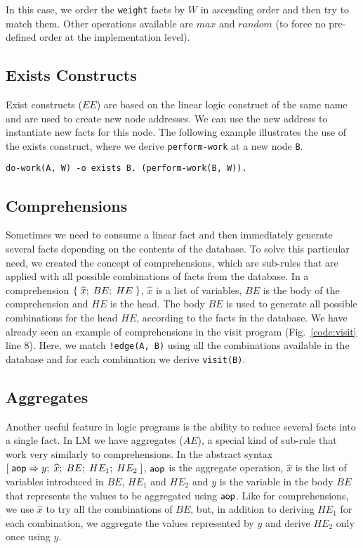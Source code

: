 In this case, we order the \texttt{weight} facts by $W$ in ascending order and then try
to match them. Other operations available are $max$ and $random$ (to force no pre-defined order at the
implementation level).

\subsection{Exists Constructs}

Exist constructs ($EE$) are based on the linear logic construct of the same name and are used to create new node addresses.
We can use the new address to instantiate new facts for this node.  
The following example illustrates the use of the exists construct, where we derive
\texttt{perform-work} at a new node \texttt{B}.

\begin{Verbatim}
do-work(A, W) -o exists B. (perform-work(B, W)).
\end{Verbatim}


\subsection{Comprehensions}

Sometimes we need to consume a linear fact and then immediately generate several facts depending on
the contents of the database. To solve this particular need, we created the concept of comprehensions, which are
sub-rules that are applied with all possible combinations of facts from the database. In a comprehension $\{ \; \widehat{x}; \; BE; \; HE \; \}$, $\widehat{x}$ is a list of variables, $BE$ is the body of the comprehension and $HE$ is the head.
The body $BE$ is used to generate all possible combinations for the head $HE$, according to the facts
in the database.  We have already seen an example of comprehensions in the visit program (Fig.~\ref{code:visit} line 8).
Here, we match \texttt{!edge(A, B)} using all the combinations available in the database and for each combination we derive \texttt{visit(B)}.

\subsection{Aggregates}

Another useful feature in logic programs is the ability to reduce several facts into a single fact.
In LM we have aggregates ($AE$), a special kind of sub-rule that work very similarly to comprehensions.
In the abstract syntax $[\;\mathsf{aop} \Rightarrow y; \; \widehat{x}; \; BE; \; HE_1; \; HE_2 \;]$, $\mathsf{aop}$ is the aggregate operation, $\widehat{x}$ is the list of variables
introduced in $BE$, $HE_1$ and $HE_2$ and $y$ is the variable in the body
$BE$ that represents the values to be aggregated using $\mathsf{aop}$. Like for comprehensions,
we use $\widehat{x}$ to try all the combinations of $BE$, but, in addition to deriving $HE_1$ for each combination,
we aggregate the values represented by $y$ and derive $HE_2$ only once using $y$.

